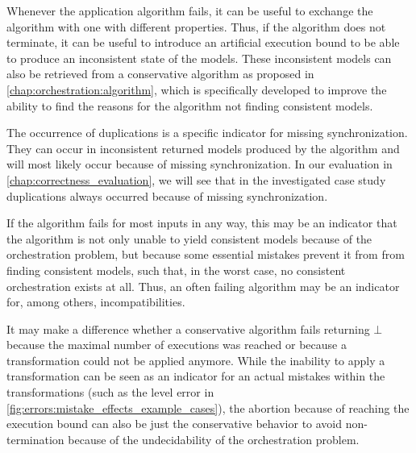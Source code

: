 Whenever the application algorithm fails, it can be useful to exchange the algorithm with one with different properties.
Thus, if the algorithm does not terminate, it can be useful to introduce an artificial execution bound to be able to produce an inconsistent state of the models.
These inconsistent models can also be retrieved from a conservative algorithm as proposed in \autoref{chap:orchestration:algorithm}, which is specifically developed to improve the ability to find the reasons for the algorithm not finding consistent models.

The occurrence of duplications is a specific indicator for missing synchronization.
They can occur in inconsistent returned models produced by the algorithm and will most likely occur because of missing synchronization.
In our evaluation in \autoref{chap:correctness_evaluation}, we will see that in the investigated case study duplications always occurred because of missing synchronization.

If the algorithm fails for most inputs in any way, this may be an indicator that the algorithm is not only unable to yield consistent models because of the orchestration problem, but because some essential mistakes prevent it from from finding consistent models, such that, in the worst case, no consistent orchestration exists at all.
Thus, an often failing algorithm may be an indicator for, among others, incompatibilities.

It may make a difference whether a conservative algorithm fails returning $\bot$ because the maximal number of executions was reached or because a transformation could not be applied anymore.
While the inability to apply a transformation can be seen as an indicator for an actual mistakes within the transformations (such as the \levelnetworkrelation level error in \autoref{fig:errors:mistake_effects_example_cases}), the abortion because of reaching the execution bound can also be just the conservative behavior to avoid non-termination because of the undecidability of the orchestration problem.


